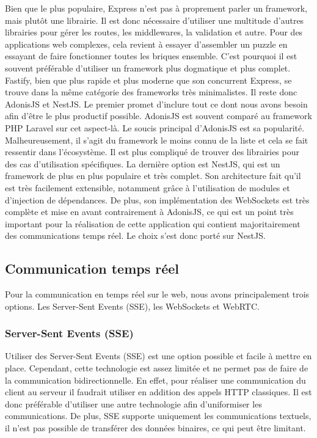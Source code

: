 Bien que le plus populaire, Express n'est pas à proprement parler un framework, mais plutôt une librairie. Il est donc nécessaire d'utiliser une multitude d'autres librairies pour gérer les routes, les middlewares, la validation et autre. Pour des applications web complexes, cela revient à essayer d'assembler un puzzle en essayant de faire fonctionner toutes les briques ensemble. C'est pourquoi il est souvent préférable d'utiliser un framework plus dogmatique et plus complet. Fastify, bien que plus rapide et plus moderne que son concurrent Express, se trouve dans la même catégorie des frameworks très minimalistes. Il reste donc AdonisJS et NestJS. Le premier promet d'inclure tout ce dont nous avons besoin afin d'être le plus productif possible. AdonisJS est souvent comparé au framework PHP Laravel sur cet aspect-là. Le soucis principal d'AdonisJS est sa popularité. Malheureusement, il s'agit du framework le moins connu de la liste et cela se fait ressentir dans l'écosystème. Il est plus compliqué de trouver des librairies pour des cas d'utilisation spécifiques. La dernière option est NestJS, qui est un framework de plus en plus populaire et très complet. Son architecture fait qu'il est très facilement extensible, notamment grâce à l'utilisation de modules et d'injection de dépendances. De plus, son implémentation des WebSockets est très complète et mise en avant contrairement à AdonisJS, ce qui est un point très important pour la réalisation de cette application qui contient majoritairement des communications temps réel. Le choix s'est donc porté sur NestJS.

\subsection{Communication temps réel}

Pour la communication en temps réel sur le web, nous avons principalement trois options. Les Server-Sent Events (SSE), les WebSockets et WebRTC.

\subsubsection{Server-Sent Events (SSE)}
Utiliser des Server-Sent Events (SSE) est une option possible et facile à mettre en place. Cependant, cette technologie est assez limitée et ne permet pas de faire de la communication bidirectionnelle. En effet, pour réaliser une communication du client au serveur il faudrait utiliser en addition des appels HTTP classiques. Il est donc préférable d'utiliser une autre technologie afin d'uniformiser les communications. De plus, SSE supporte uniquement les communications textuels, il n'est pas possible de transférer des données binaires, ce qui peut être limitant.

